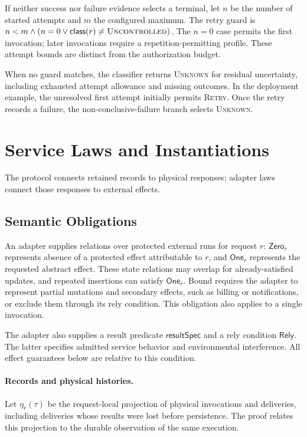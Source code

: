 \documentclass[acmsmall,screen,review,anonymous]{acmart}
\newcommand{\Unknown}{\textsc{Unknown}\xspace}
\newcommand{\Retry}{\textsc{Retry}\xspace}
\newcommand{\Uncontrolled}{\textsc{Uncontrolled}\xspace}
\begin{document}
If neither success nor failure evidence selects a terminal, let $n$ be the
number of started attempts and $m$ the configured maximum. The retry guard is
$n<m\land(n=0\lor\mathsf{class}(r)\ne\Uncontrolled)$.
The $n=0$ case permits the first invocation; later invocations require
a repetition-permitting profile. These attempt bounds are distinct
from the authorization budget.

When no guard matches, the classifier returns \Unknown for residual uncertainty,
including exhausted attempt allowance and missing outcomes. In the
deployment example, the unresolved first attempt initially permits
\Retry. Once the retry records a failure, the non-conclusive-failure
branch selects \Unknown.

\section{Service Laws and Instantiations}
\label{sec:service-laws}

The protocol connects retained records to physical responses; adapter
laws connect those responses to external effects.

\subsection{Semantic Obligations}

An adapter supplies relations over protected external runs for request
$r$: $\mathsf{Zero}_r$ represents absence of a protected effect attributable
to $r$, and $\mathsf{One}_r$ represents the requested abstract effect.
These state relations may overlap for already-satisfied updates, and repeated
insertions can satisfy $\mathsf{One}_r$. Bound requires the adapter to
represent partial mutations and secondary effects, such as billing or
notifications, or exclude them through its rely condition. This obligation
also applies to a single invocation.

The adapter also supplies a result predicate $\mathsf{resultSpec}$
and a rely condition $\mathsf{Rely}$. The latter specifies admitted
service behavior and environmental interference. All effect
guarantees below are relative to this condition.

\paragraph{Records and physical histories.}
Let $\eta_r(\tau)$ be the request-local projection of physical invocations
and deliveries, including deliveries whose results were lost before
persistence. The proof relates this projection to the durable observation
of the same execution.
\end{document}
